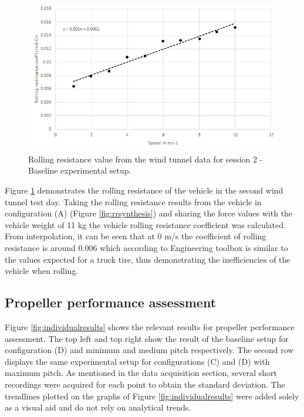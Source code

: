 \begin{figure}[!htbp]
    \centering
    \includegraphics[width=0.9\linewidth]{images/part11/rollingresistance.png}
    \caption{Rolling resistance value from the wind tunnel data for session 2 - Baseline experimental setup.}
    \label{fig:rr}
\end{figure}

Figure \ref{fig:rr} demonstrates the rolling resistance of the vehicle in the second wind tunnel test day. Taking the rolling resistance results from the vehicle in configuration (A) (Figure \ref{fig:rrsynthesis}) and sharing the force values with the vehicle weight of 11 kg the vehicle rolling resistance coefficient was calculated. From interpolation, it can be seen that at 0 m/s the coefficient of rolling resistance is around 0.006 which according to Engineering toolbox \cite{rolling} is similar to the values expected for a truck tire, thus demonstrating the inefficiencies of the vehicle when rolling.

\subsection{Propeller performance assessment}

Figure \ref{fig:individualresults} shows the relevant results for propeller performance assessment. The top left and top right show the result of the baseline setup for configuration (D) and minimum and medium pitch respectively. The second row displays the same experimental setup for configurations (C) and (D) with maximum pitch. As mentioned in the data acquisition section, several short recordings were acquired for each point to obtain the standard deviation. The trendlines plotted on the graphs of Figure \ref{fig:individualresults} were added solely as a visual aid and do not rely on analytical trends.  

